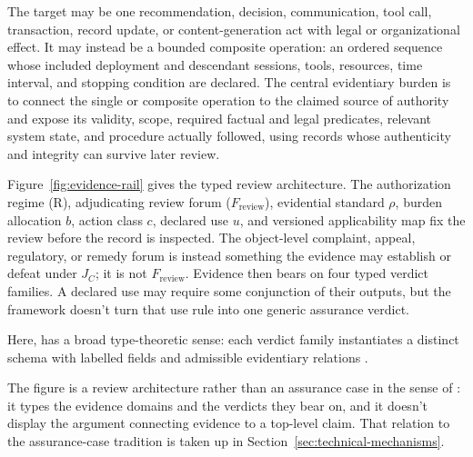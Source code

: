 The target may be one recommendation, decision, communication, tool call, transaction, record update, or content-generation act with legal or organizational effect. It may instead be a bounded composite operation: an ordered sequence whose included deployment and descendant sessions, tools, resources, time interval, and stopping condition are declared. The central evidentiary burden is to connect the single or composite operation to the claimed source of authority and expose its validity, scope, required factual and legal predicates, relevant system state, and procedure actually followed, using records whose authenticity and integrity can survive later review.

Figure~\ref{fig:evidence-rail} gives the typed review architecture. The authorization regime (R), adjudicating review forum (\(F_{\mathrm{review}}\)), evidential standard \(\rho\), burden allocation \(b\), action class \(c\), declared use \(u\), and versioned applicability map fix the review before the record is inspected. The object-level complaint, appeal, regulatory, or remedy forum is instead something the evidence may establish or defeat under \(J_C\); it is not \(F_{\mathrm{review}}\). Evidence then bears on four typed verdict families. A declared use may require some conjunction of their outputs, but the framework doesn't turn that use rule into one generic assurance verdict.

Here,  has a broad type-theoretic sense: each verdict family instantiates a distinct schema with labelled fields and admissible evidentiary relations \citep[sec.~11.8]{pierce2002types}.

The figure is a review architecture rather than an assurance case in the sense of \textcite{isoIecIeee2022assuranceCase}: it types the evidence domains and the verdicts they bear on, and it doesn't display the argument connecting evidence to a top-level claim. That relation to the assurance-case tradition is taken up in Section~\ref{sec:technical-mechanisms}.

